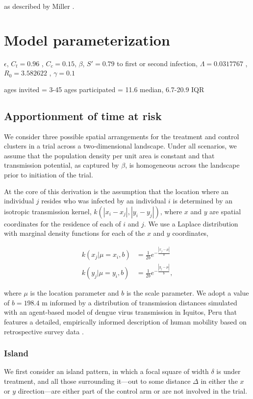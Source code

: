 \documentclass[11pt]{amsart}
\begin{document}
\noindent as described by Miller \cite{Miller2012}.


\section{Model parameterization}

$\epsilon$, $C_t=0.96$ \cite{Utarini2021}, $C_c=0.15$, $\beta$, $S'=0.79$ to first or second infection, $\Lambda=0.0317767$ \cite{Cattarino2020}, $R_0=3.582622$ \cite{Cattarino}, $\gamma=0.1$ \cite{tenBosch2018}

ages invited = 3-45
ages participated = 11.6 median, 6.7-20.9 IQR

\subsection{Apportionment of time at risk} We consider three possible spatial arrangements for the treatment and control clusters in a trial across a two-dimensional landscape. Under all scenarios, we assume that the population density per unit area is constant and that transmission potential, as captured by $\beta$, is homogeneous across the landscape prior to initiation of the trial.

At the core of this derivation is the assumption that the location where an individual $j$ resides who was infected by an individual $i$ is determined by an isotropic transmission kernel, $k\left(|x_i-x_j|,|y_i-y_j|\right)$, where $x$ and $y$ are spatial coordinates for the residence of each of $i$ and $j$. We use a Laplace distribution with marginal density functions for each of the $x$ and $y$ coordinates,

\begin{align}
k(x_j|\mu=x_i,b) &= \frac{1}{2b} e^{-\frac{|x_j-\mu|}{b}} \\
k(y_j|\mu=y_i,b) &= \frac{1}{2b} e^{-\frac{|y_j-\mu|}{b}} ,
\end{align}

\noindent where $\mu$ is the location parameter and $b$ is the scale parameter. We adopt a value of $b=198.4$ m informed by a distribution of transmission distances simulated with an agent-based model of dengue virus transmission in Iquitos, Peru \cite{Perkins2016,Cavany2020} that features a detailed, empirically informed description of human mobility based on retrospective survey data \cite{Perkins2014}.

\subsubsection{Island}
We first consider an island pattern, in which a focal square of width $\delta$ is under treatment, and all those surrounding it---out to some distance $\Delta$ in either the $x$ or $y$ direction---are either part of the control arm or are not involved in the trial.
\end{document}
